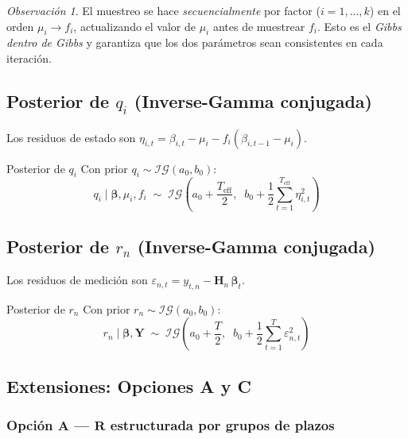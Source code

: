 \documentclass[12pt, a4paper]{article}
\theoremstyle{plain}
\theoremstyle{definition}
\theoremstyle{remark}
\newtheorem{observacion}{Observación}[section]
\newcommand{\bbet}{\bm{\beta}}
\newcommand{\bY}{\mathbf{Y}}
\newcommand{\bH}{\mathbf{H}}
\newcommand{\bR}{\mathbf{R}}
\newcommand{\IG}{\mathcal{IG}}
\begin{document}
\begin{observacion}
El muestreo se hace \emph{secuencialmente} por factor ($i = 1,\ldots,k$)
en el orden $\mu_i \to f_i$, actualizando el valor de $\mu_i$ antes
de muestrear $f_i$. Esto es el \emph{Gibbs dentro de Gibbs} y garantiza
que los dos parámetros sean consistentes en cada iteración.
\end{observacion}

\subsection{Posterior de $q_i$ (Inverse-Gamma conjugada)}

Los residuos de estado son $\eta_{i,t} = \beta_{i,t} - \mu_i - f_i(\beta_{i,t-1} - \mu_i)$.

\begin{teoremabox}{Posterior de $q_i$}
Con prior $q_i \sim \IG(a_0, b_0)$:
\begin{equation}
  q_i \mid \bbet, \mu_i, f_i \;\sim\;
  \IG\!\left(a_0 + \frac{T_\text{eff}}{2},\;\;
    b_0 + \frac{1}{2}\sum_{t=1}^{T_\text{eff}}\eta_{i,t}^2\right)
  \label{eq:post_q}
\end{equation}
\end{teoremabox}

\subsection{Posterior de $r_n$ (Inverse-Gamma conjugada)}

Los residuos de medición son $\varepsilon_{n,t} = y_{t,n} - \bH_n\,\bbet_t$.

\begin{teoremabox}{Posterior de $r_n$}
Con prior $r_n \sim \IG(a_0, b_0)$:
\begin{equation}
  r_n \mid \bbet, \bY \;\sim\;
  \IG\!\left(a_0 + \frac{T}{2},\;\;
    b_0 + \frac{1}{2}\sum_{t=1}^{T}\varepsilon_{n,t}^2\right)
  \label{eq:post_r}
\end{equation}
\end{teoremabox}

\subsection{Extensiones: Opciones A y C}

\subsubsection{Opción A — $\bR$ estructurada por grupos de plazos}
\end{document}
